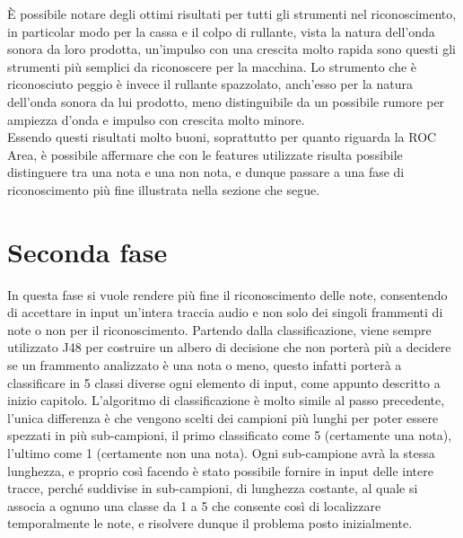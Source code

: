 È possibile notare degli ottimi risultati per tutti gli strumenti nel riconoscimento, in particolar modo per la cassa e il colpo di rullante, vista la natura dell'onda sonora da loro prodotta, un'impulso con una crescita molto rapida sono questi gli strumenti più semplici da riconoscere per la macchina. Lo strumento che è riconosciuto peggio è invece il rullante spazzolato, anch'esso per la natura dell'onda sonora da lui prodotto, meno distinguibile da un possibile rumore per ampiezza d'onda e impulso con crescita molto minore.\\
Essendo questi risultati molto buoni, soprattutto per quanto riguarda la ROC Area, è possibile affermare che con le features utilizzate risulta possibile distinguere tra una nota e una non nota, e dunque passare a una fase di riconoscimento più fine illustrata nella sezione che segue.\\

\section{Seconda fase}
In questa fase si vuole rendere più fine il riconoscimento delle note, consentendo di accettare in input un'intera traccia audio e non solo dei singoli frammenti di note o non per il riconoscimento. Partendo dalla classificazione, viene sempre utilizzato J48 per costruire un albero di decisione che non porterà più a decidere se un frammento analizzato è una nota o meno, questo infatti porterà a classificare in 5 classi diverse ogni elemento di input, come appunto descritto a inizio capitolo. L'algoritmo di classificazione è molto simile al passo precedente, l'unica differenza è che vengono scelti dei campioni più lunghi per poter essere spezzati in più sub-campioni, il primo classificato come 5 (certamente una nota), l'ultimo come 1 (certamente non una nota). Ogni sub-campione avrà la stessa lunghezza, e proprio così facendo è stato possibile fornire in input delle intere tracce, perché suddivise in sub-campioni, di lunghezza costante, al quale si associa a ognuno una classe da 1 a 5 che consente così di localizzare temporalmente le note, e risolvere dunque il problema posto inizialmente.\\

